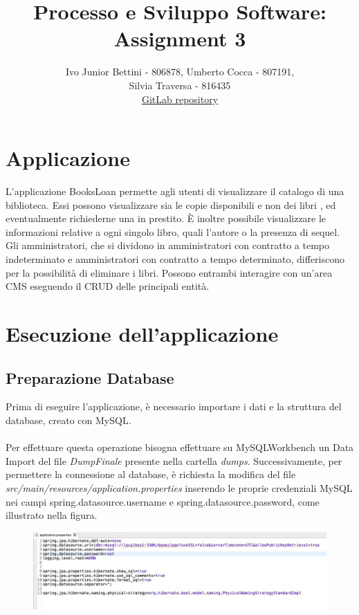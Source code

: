 \documentclass[a4paper,10pt]{article}
\title{Processo e Sviluppo Software: Assignment 3}
\author{Ivo Junior Bettini - 806878, Umberto Cocca - 807191, \\Silvia Traversa - 816435\\
\href{https://gitlab.com/s.traversa/2019_assignment3_booksloan}{GitLab repository}}
\date{}
\begin{document}
\maketitle 

\section*{Applicazione}
L'applicazione BooksLoan permette agli utenti di visualizzare il catalogo di una biblioteca. Essi possono visualizzare sia le copie disponibili e non dei libri , ed eventualmente richiederne una in prestito.
È inoltre possibile visualizzare le informazioni relative a ogni singolo libro, quali l'autore o la presenza di sequel.\\ 

\noindent Gli amministratori, che si dividono in amministratori con contratto a tempo indeterminato e amministratori con contratto a tempo determinato, differiscono per la possibilità di eliminare i libri. Possono entrambi interagire con un'area CMS eseguendo il CRUD delle principali entità. 

\section*{Esecuzione dell'applicazione}
\subsection*{Preparazione Database}
Prima di eseguire l'applicazione, è necessario importare i dati e la struttura del database, creato con MySQL.\\\\
Per effettuare questa operazione bisogna effettuare su MySQLWorkbench un Data Import del file \textit{DumpFinale} presente nella cartella \textit{dumps}. Successivamente, per permettere la connessione al database, è richiesta la modifica del file \textit{src/main/resources/application.properties} inserendo le proprie credenziali MySQL nei campi spring.datasource.username e spring.datasource.password, come illustrato nella figura.\\
\begin{figure}[H]
	\centering
	\includegraphics[width=1\linewidth]{images/properties}
\end{figure}
\newpage
\end{document}

